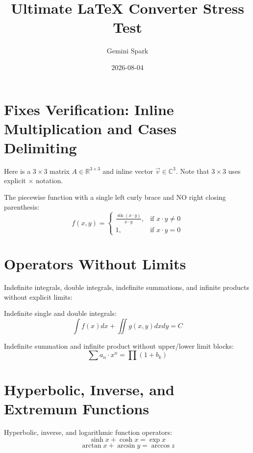\documentclass{article}
\title{Ultimate LaTeX Converter Stress Test}
\author{Gemini Spark}
\date{2026-08-04}
\begin{document}
\maketitle

\section{Fixes Verification: Inline Multiplication and Cases Delimiting}
Here is a $3 \times 3$ matrix $A \in \mathbb{R}^{3 \times 3}$ and inline vector $\vec{v} \in \mathbb{C}^{3}$. Note that $3 \times 3$ uses explicit $\times$ notation.

The piecewise function with a single left curly brace and NO right closing parenthesis:
\begin{equation}
f(x, y) = \begin{cases} \frac{\sin{\left( x \cdot y \right)}}{x \cdot y}, & \text{if } x \cdot y \neq 0 \\ 1, & \text{if } x \cdot y = 0 \end{cases}
\end{equation}

\section{Operators Without Limits}
Indefinite integrals, double integrals, indefinite summations, and infinite products without explicit limits:

Indefinite single and double integrals:
\begin{equation}
\int{f(x) dx} + \iint{g(x, y) dx dy} = C
\end{equation}

Indefinite summation and infinite product without upper/lower limit blocks:
\begin{equation}
\sum{a_{n} \cdot x^{n}} = \prod{\left( 1 + b_{k} \right)}
\end{equation}

\section{Hyperbolic, Inverse, and Extremum Functions}
Hyperbolic, inverse, and logarithmic function operators:
\begin{equation}
\sinh{x} + \cosh{x} = \exp{x}
\end{equation}
\begin{equation}
\arctan{x} + \arcsin{y} = \arccos{z}
\end{equation}
\end{document}
